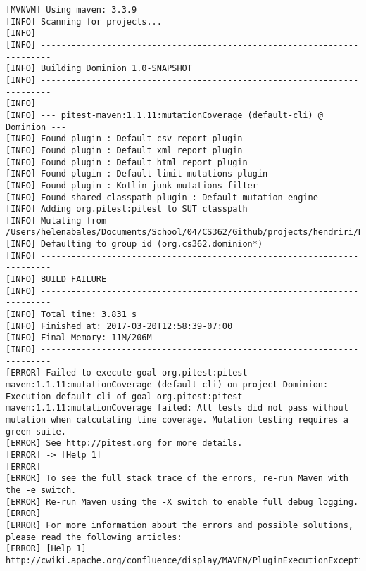 \begin{lstlisting}
[MVNVM] Using maven: 3.3.9
[INFO] Scanning for projects...
[INFO]                                                                         
[INFO] ------------------------------------------------------------------------
[INFO] Building Dominion 1.0-SNAPSHOT
[INFO] ------------------------------------------------------------------------
[INFO] 
[INFO] --- pitest-maven:1.1.11:mutationCoverage (default-cli) @ Dominion ---
[INFO] Found plugin : Default csv report plugin
[INFO] Found plugin : Default xml report plugin
[INFO] Found plugin : Default html report plugin
[INFO] Found plugin : Default limit mutations plugin
[INFO] Found plugin : Kotlin junk mutations filter
[INFO] Found shared classpath plugin : Default mutation engine
[INFO] Adding org.pitest:pitest to SUT classpath
[INFO] Mutating from /Users/helenabales/Documents/School/04/CS362/Github/projects/hendriri/Dominion/target/classes
[INFO] Defaulting to group id (org.cs362.dominion*)
[INFO] ------------------------------------------------------------------------
[INFO] BUILD FAILURE
[INFO] ------------------------------------------------------------------------
[INFO] Total time: 3.831 s
[INFO] Finished at: 2017-03-20T12:58:39-07:00
[INFO] Final Memory: 11M/206M
[INFO] ------------------------------------------------------------------------
[ERROR] Failed to execute goal org.pitest:pitest-maven:1.1.11:mutationCoverage (default-cli) on project Dominion: Execution default-cli of goal org.pitest:pitest-maven:1.1.11:mutationCoverage failed: All tests did not pass without mutation when calculating line coverage. Mutation testing requires a green suite.
[ERROR] See http://pitest.org for more details.
[ERROR] -> [Help 1]
[ERROR] 
[ERROR] To see the full stack trace of the errors, re-run Maven with the -e switch.
[ERROR] Re-run Maven using the -X switch to enable full debug logging.
[ERROR] 
[ERROR] For more information about the errors and possible solutions, please read the following articles:
[ERROR] [Help 1] http://cwiki.apache.org/confluence/display/MAVEN/PluginExecutionException
\end{lstlisting}
